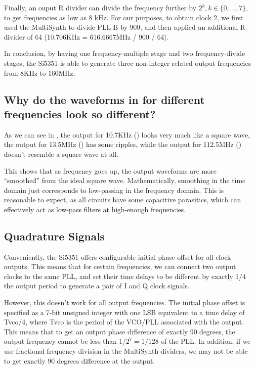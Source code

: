 \documentclass{article}
\begin{document}
Finally, an ouput R divider can divide the frequency further by $2^k, k\in\{0,...,7\}$, to get frequencies as low as 8 kHz.
For our purposes, to obtain clock 2, we first used the MultiSynth to divide PLL B by 900, and then applied an additional R divider of 64 (10.706KHz = 616.6667MHz / 900 / 64).

In conclusion, by having one frequency-multiple stage and two frequency-divide stages, the Si5351 is able to generate three non-integer related output frequencies from 8KHz to 160MHz.

\subsection{Why do the waveforms in for different frequencies look so different?}
\label{sec:waveform_diff}

As we can see in , the output for 10.7KHz () looks very much like a square wave, the output for 13.5MHz () has some ripples, while the output for 112.5MHz () doesn't resemble a square wave at all.

This shows that as frequency goes up, the output waveforms are more ``smoothed'' from the ideal square wave.
Mathematically, smoothing in the time domain just corresponds to low-passing in the frequency domain.
This is reasonable to expect, as all circuits have some capacitive parasitics, which can effectively act as low-pass filters at high-enough frequencies.

\subsection{Quadrature Signals}
\label{sec:iq}
Conveniently, the Si5351 offers configurable initial phase offset for all clock outputs.
This means that for certain frequencies, we can connect two output clocks to the same PLL, and set their time delays to be different by exactly 1/4 the output period to generate a pair of I and Q clock signals.

However, this doesn't work for all output frequencies.
The initial phase offset is specified as a 7-bit unsigned integer with one LSB equivalent to a time delay of Tvco/4, where Tvco is the period of the VCO/PLL associated with the output.
This means that to get an output phase difference of exactly 90 degrees, the output frequency cannot be less than $1/2^7=1/128$ of the PLL.
In addition, if we use fractional frequency division in the MultiSynth dividers, we may not be able to get exactly 90 degrees difference at the output.
\end{document}
